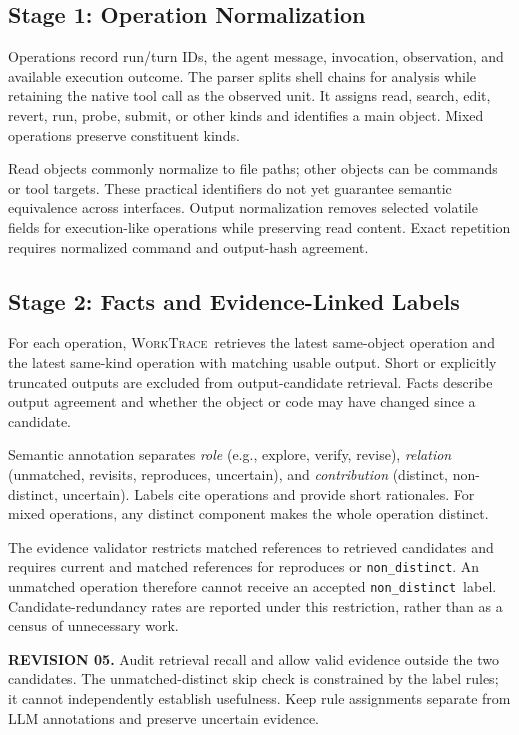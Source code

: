 \documentclass[10pt,a4paper,twocolumn]{article}
\newcommand{\rev}[2]{\par\smallskip\noindent\begin{minipage}{\linewidth}\color{revision}\footnotesize\textbf{REVISION #1.} #2\end{minipage}\par\smallskip}
\newcommand{\nd}{\texttt{non\_distinct}}
\newcommand{\wt}{\textsc{WorkTrace}}
\begin{document}
\subsection{Stage 1: Operation Normalization}
Operations record run/turn IDs, the agent message, invocation, observation, and available execution outcome. The parser splits shell chains for analysis while retaining the native tool call as the observed unit. It assigns read, search, edit, revert, run, probe, submit, or other kinds and identifies a main object. Mixed operations preserve constituent kinds.

Read objects commonly normalize to file paths; other objects can be commands or tool targets. These practical identifiers do not yet guarantee semantic equivalence across interfaces. Output normalization removes selected volatile fields for execution-like operations while preserving read content. Exact repetition requires normalized command and output-hash agreement.

\subsection{Stage 2: Facts and Evidence-Linked Labels}
For each operation, \wt\ retrieves the latest same-object operation and the latest same-kind operation with matching usable output. Short or explicitly truncated outputs are excluded from output-candidate retrieval. Facts describe output agreement and whether the object or code may have changed since a candidate.

Semantic annotation separates \emph{role} (e.g., explore, verify, revise), \emph{relation} (unmatched, revisits, reproduces, uncertain), and \emph{contribution} (distinct, non-distinct, uncertain). Labels cite operations and provide short rationales. For mixed operations, any distinct component makes the whole operation distinct.

The evidence validator restricts matched references to retrieved candidates and requires current and matched references for reproduces or \nd. An unmatched operation therefore cannot receive an accepted \nd\ label. Candidate-redundancy rates are reported under this restriction, rather than as a census of unnecessary work.
\rev{05}{Audit retrieval recall and allow valid evidence outside the two candidates. The unmatched-distinct skip check is constrained by the label rules; it cannot independently establish usefulness. Keep rule assignments separate from LLM annotations and preserve uncertain evidence.}
\end{document}
